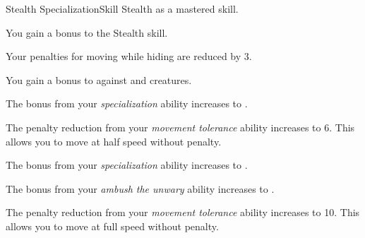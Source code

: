     \begin{feat}{Stealth Specialization}{Skill}
        \featpre Stealth as a mastered skill.

         You gain a  bonus to the Stealth skill.

         Your penalties for moving while hiding are reduced by 3.

         You gain a  bonus to  against \unaware and \partiallyunaware creatures.

         The bonus from your \textit{specialization} ability increases to .

         The penalty reduction from your \textit{movement tolerance} ability increases to 6.
        This allows you to move at half speed without penalty.

         The bonus from your \textit{specialization} ability increases to .

         The bonus from your \textit{ambush the unwary} ability increases to .

         The penalty reduction from your \textit{movement tolerance} ability increases to 10.
        This allows you to move at full speed without penalty.
    \end{feat}

